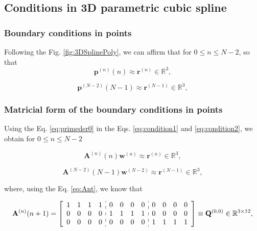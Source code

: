\subsection{Conditions in 3D parametric cubic spline}\label{sec:boundarycubic}

\subsubsection{Boundary conditions in points}

Following the Fig. \ref{fig:3DSplinePoly}, 
we can affirm that for $0 \leq n\leq N-2$,
so that
\begin{equation}\label{eq:condition1}
\mathbf{p}^{(n)}(n)\approx \mathbf{r}^{(n)}
\in \mathbb{R}^{3},
\end{equation}

\begin{equation}\label{eq:condition2}
\mathbf{p}^{(N-2)}(N-1)\approx \mathbf{r}^{(N-1)}
\in \mathbb{R}^{3},
\end{equation}

\subsubsection{Matricial form of the boundary conditions in points}
Using 
the Eq. \ref{eq:primeder0} in 
the Eqs. \ref{eq:condition1} and \ref{eq:condition2},
we obtain for $0 \leq n\leq N-2$

\begin{equation}\label{eq:pointcond1}
\mathbf{A}^{(n)}(n) \mathbf{w}^{(n)}\approx \mathbf{r}^{(n)}
\in \mathbb{R}^{3},
\end{equation}

\begin{equation}\label{eq:pointcond2}
\mathbf{A}^{(N-2)}(N-1) \mathbf{w}^{(N-2)}\approx \mathbf{r}^{(N-1)}
\in \mathbb{R}^{3},
\end{equation}





where, using the Eq. \ref{eq:Ant}, we know that

\begin{equation}\label{eq:Q00}
\mathbf{A}^{(n)}(n+1)=
\left[
\begin{array}{cccc:cccc:cccc}
1 & 1 & 1 & 1 &
0 & 0 & 0 & 0 &
0 & 0 & 0 & 0 \\
0 & 0 & 0 & 0 &
1 & 1 & 1 & 1 &
0 & 0 & 0 & 0 \\
0 & 0 & 0 & 0 &
0 & 0 & 0 & 0 &
1 & 1 & 1 & 1 
\end{array}
\right]
\equiv \mathbf{Q}^{(0,0)}\in \mathbb{R}^{3\times 12},
\end{equation}

